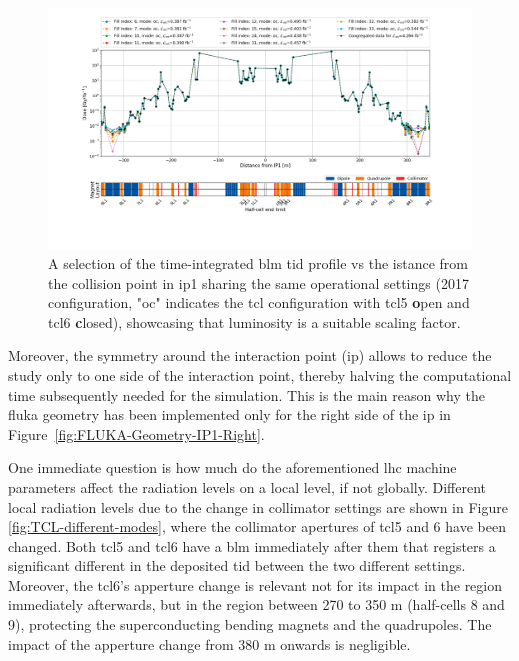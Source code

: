 \documentclass[encoding=utf8,british]{tumphthesis}
\begin{document}
\begin{figure}[H]
    \centering
    \includegraphics[width=1.0\linewidth]{results/2017after_oc_data_LEFT_vs_RIGHT.png}
    \caption{A selection of the time-integrated \acrshort{blm} \acrshort{tid} profile vs the istance from the collision point in \acrshort{ip}1 sharing the same operational settings (2017 configuration, "oc" indicates the \acrshort{tcl} configuration with \acrshort{tcl}5 \textbf{o}pen and \acrshort{tcl}6 \textbf{c}losed), showcasing that luminosity is a suitable scaling factor.}
    \label{fig:BLM_profile_measured_IP1_left_and_right}
\end{figure}

Moreover, the symmetry around the interaction point (\acrshort{ip}) allows to reduce the study only to one side of the interaction point, thereby halving the computational time subsequently needed for the simulation. This is the main reason why the \acrshort{fluka} geometry has been implemented only for the right side of the \acrshort{ip} in Figure~\ref{fig:FLUKA-Geometry-IP1-Right}.


One immediate question is how much do the aforementioned \acrshort{lhc} machine parameters affect the radiation levels on a local level, if not globally. Different local radiation levels due to the change in collimator settings are shown in Figure \ref{fig:TCL-different-modes}, where the collimator apertures of \acrshort{tcl}5 and 6 have been changed. Both \acrshort{tcl}5 and \acrshort{tcl}6 have a \acrshort{blm} immediately after them that registers a significant different in the deposited \acrshort{tid} between the two different settings. Moreover, the \acrshort{tcl}6's apperture change is relevant not for its impact in the region immediately afterwards, but in the region between 270 to 350 m (half-cells 8 and 9), protecting the superconducting bending magnets and the quadrupoles. The impact of the apperture change from 380 m onwards is negligible.
\end{document}
